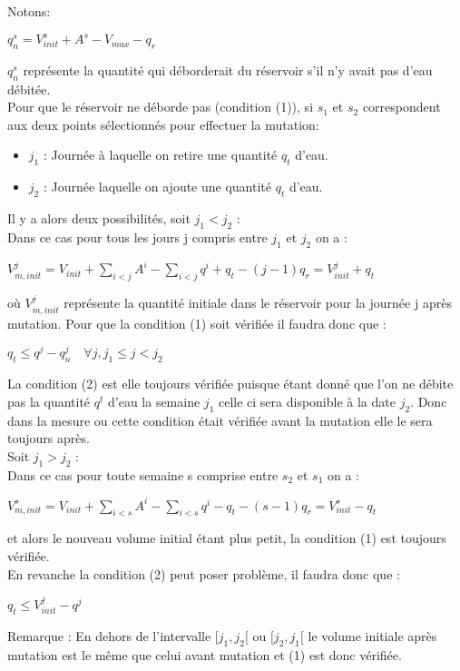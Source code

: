 \documentclass[a4paper]{report}
\begin{document}
Notons:\\
\begin{center}
$q_{n}^{s}=V^{s}_{init}+ A^{s}-V_{max}- q_{r}$
\end{center}
$q_n^s$ représente la quantité qui déborderait du réservoir s'il n'y avait pas d'eau débitée.\\
Pour que le réservoir ne déborde pas (condition (1)), si $s_{1}$ et $s_{2}$ correspondent aux deux points sélectionnés pour effectuer la mutation:\\
\begin{itemize}
\item $j_{1}$ : Journée à laquelle on retire une quantité $q_{t}$ d'eau.
\item $j_{2}$ : Journée laquelle on ajoute une quantité $q_{t}$ d'eau.
\end{itemize}
 Il y a alors deux possibilités, soit $ j_{1} < j_{2}$ :\\
 Dans ce cas pour tous les jours j compris entre $j_{1}$ et $j_{2}$ on a :\\
 \begin{center}
$V^{j}_{m,init}=V_{init} +\sum_{i<j}A^{i}-\sum_{i<j}q^{i}  +q_{t} - (j-1) q_{r} = V^{j}_{init}+ q_{t}$
\end{center}
où $V^{j}_{m,init}$ représente la quantité initiale dans le réservoir pour la journée j après mutation.
Pour que la condition (1) soit vérifiée il faudra donc que :\\
\begin{center}
$q_{t}\leq q^{j}-q^{j}_{n} \quad \forall j, j_{1}\leq j< j_{2}$
\end{center}
La condition (2) est elle toujours vérifiée puisque étant donné que l'on ne débite pas la quantité $q^t$ d'eau la semaine $j_1$ celle ci sera disponible à la date $j_2$. Donc dans la mesure ou cette condition était vérifiée avant la mutation elle le sera toujours après.\\
Soit $ j_{1} > j_{2}$ :\\
Dans ce cas pour toute semaine s comprise entre $s_{2}$ et $s_{1}$ on a :\\
 \begin{center}
$V^{s}_{m,init}=V_{init} +\sum_{i<s}A^{i}-\sum_{i<s}q^{i}  -q_{t} - (s-1) q_{r} = V^{s}_{init}- q_{t}$
\end{center}
et alors le nouveau volume initial étant plus petit, la condition (1) est toujours vérifiée. \\
En revanche la condition (2) peut poser problème, il faudra donc que :
\begin{center}
$q_t \leq V^j_{init} - q^j$
\end{center}
Remarque : En dehors de l'intervalle $[j_{1},j_{2}[$ ou $[j_{2},j_{1}[$ le volume initiale après mutation est le même que celui avant mutation et (1) est donc vérifiée.
\end{document}
